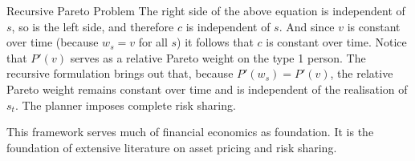 \documentclass[aspectratio=169,xcolor=dvipsnames]{beamer}
\begin{document}
\begin{frame}{Recursive Pareto Problem}
    The right side of the above equation is independent of $s$, so is the left side, and therefore $c$ is independent of $s$. And since $v$ is constant over time (because $w_s = v$ for all $s$) it follows that $c$ is constant over time. Notice that $P'(v)$ serves as a relative Pareto weight on the type 1 person. The recursive formulation brings out that, because $P'(w_s) = P'(v)$, the relative Pareto weight remains constant over time and is independent of the realisation of $s_t$. The planner imposes complete risk sharing.

    This framework serves much of financial economics as foundation. It is the foundation of extensive literature on asset pricing and risk sharing.
\end{frame}
\end{document}
